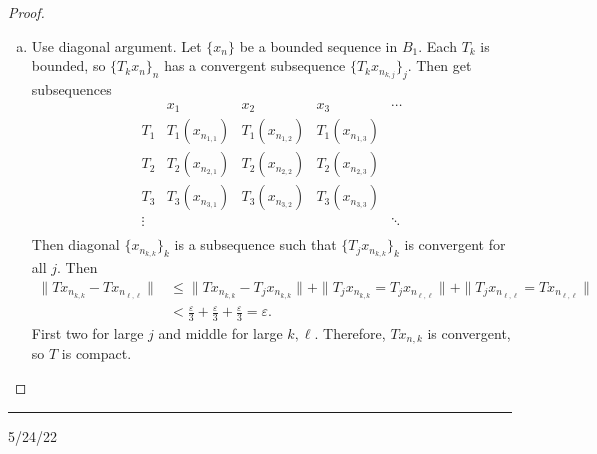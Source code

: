 \documentclass[12pt]{article}
\newcommand{\sepline}{\rule{\textwidth}{0.4pt}}
\theoremstyle{definition}
\newcommand{\eps}{\varepsilon}
\newcommand{\<}{\left\langle}
\renewcommand{\>}{\right\rangle}
\begin{document}
\begin{proof}
    \begin{enumerate}[(a)]
        \item Use diagonal argument.
        Let $\{x_n\}$ be a bounded sequence in $B_1$.
        Each $T_k$ is bounded, so $\{T_kx_n\}_n$ has a convergent subsequence $\{T_kx_{n_{k,j}}\}_j$.
        Then get subsequences
        \[
            \begin{array}{c|cccc}
                & x_1 & x_2 & x_3 & \cdots \\
                \hline
                T_1 & T_1(x_{n_{1,1}}) & T_1(x_{n_{1,2}}) & T_1(x_{n_{1,3}}) \\
                T_2 & T_2(x_{n_{2,1}}) & T_2(x_{n_{2,2}}) & T_2(x_{n_{2,3}}) \\
                T_3 & T_3(x_{n_{3,1}}) & T_3(x_{n_{3,2}}) & T_3(x_{n_{3,3}}) \\
                \vdots &&&& \ddots \\
            \end{array}
        \]
        Then diagonal $\{x_{n_{k,k}}\}_k$ is a subsequence such that $\{T_jx_{n_{k,k}}\}_k$ is convergent for all $j$.
        Then
        \begin{align*}
            \|Tx_{n_{k,k}} - Tx_{n_{\ell,\ell}}\|
                &\leq \|Tx_{n_{k,k}} - T_jx_{n_{k,k}}\|
                    + \|T_jx_{n_{k,k}} = T_jx_{n_{\ell,\ell}}\|
                    + \|T_jx_{n_{\ell,\ell}} = Tx_{n_{\ell,\ell}}\| \\
                &< \frac{\eps}{3} + \frac{\eps}{3} + \frac{\eps}{3}
                = \eps.
        \end{align*}
        First two for large $j$ and middle for large $k, \ell$.
        Therefore, $Tx_{n,k}$ is convergent, so $T$ is compact.
    \end{enumerate}
\end{proof}

\sepline

5/24/22
\end{document}
